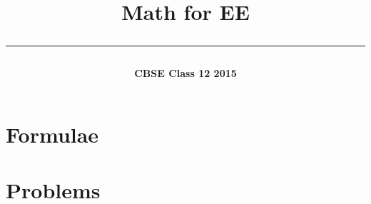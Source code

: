 \documentclass[journal]{IEEEtran}
\begin{document}

\onecolumn
\title{\begin{center}{\LARGE\bfseries Math for EE}\\\rule{0.4\columnwidth}{0.4pt}\end{center}}
\author{\vspace{11cm}\begin{center}{\fontsize{26}{31}\selectfont\bfseries CBSE Class 12 2015}\end{center}}
\maketitle
\thispagestyle{empty}
\newpage
\tableofcontents
\newpage

\section{Formulae}

\newpage
\section{Problems}


\newpage
\end{document}
